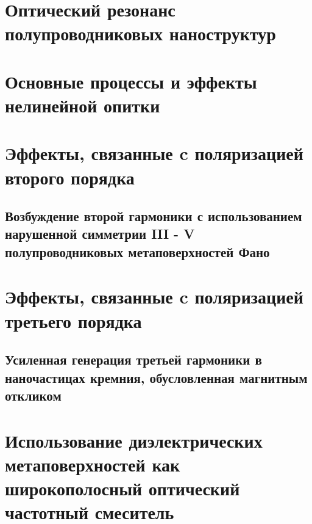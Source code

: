 \section{Оптический резонанс полупроводниковых наноструктур}


\section{Основные процессы и эффекты нелинейной опитки}


\section{Эффекты, связанные c поляризацией второго порядка}

\subsection{Возбуждение второй гармоники с использованием нарушенной симметрии III - V полупроводниковых метаповерхностей Фано}


\section{Эффекты, связанные c поляризацией третьего порядка}

\subsection{Усиленная генерация третьей гармоники в наночастицах кремния, обусловленная магнитным откликом}

\section{Использование диэлектрических метаповерхностей как широкополосный оптический частотный смеситель}


